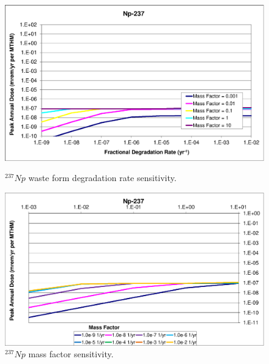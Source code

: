 \begin{figure}[ht]
\begin{minipage}[b]{0.45\linewidth}

\includegraphics[width=\linewidth]{./chapters/nuclide_sensitivity/clay/WFDegAndInv/Np-237.eps}
\caption{$^{237}Np$ waste form degradation rate sensitivity.}
\label{fig:WFDegNp237}

\end{minipage}
\hspace{0.05\linewidth}
\begin{minipage}[b]{0.45\linewidth}

\includegraphics[width=\linewidth]{./chapters/nuclide_sensitivity/clay/WFDegAndInv/Np-237-MF.eps}
\caption{$^{237}Np$ mass factor sensitivity.}
\label{fig:WFDegNp237MF}

\end{minipage}
\end{figure}
\FloatBarrier 
